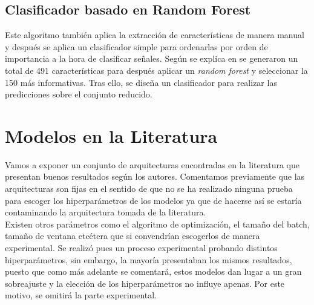     \subsection{Clasificador basado en Random Forest}
            
            Este algoritmo también aplica la extracción de características de manera manual y después se aplica un clasificador simple para ordenarlas por orden de importancia a la hora de clasificar señales. Según se explica en \cite{zabihi2017detection} se generaron un total de 491 características para después aplicar un \textit{random forest} y seleccionar la 150 más informativas. Tras ello, se diseña un clasificador para realizar las predicciones sobre el conjunto reducido. \\
    
    
\newpage 
\section{Modelos en la Literatura}

    Vamos a exponer un conjunto de arquitecturas encontradas en la literatura que presentan buenos resultados según los autores. Comentamos previamente que las arquitecturas son fijas en el sentido de que no se ha realizado ninguna prueba para escoger los hiperparámetros de los modelos ya que de hacerse así se estaría contaminando la arquitectura tomada de la literatura. \\
    
    Existen otros parámetros como el algoritmo de optimización, el tamaño del batch, tamaño de ventana etcétera que si convendrían escogerlos de manera experimental. Se realizó pues un proceso experimental probando distintos hiperparámetros, sin embargo, la mayoría presentaban los mismos resultados, puesto que como más adelante se comentará, estos modelos dan lugar a un gran sobreajuste y la elección de los hiperparámetros no influye apenas. Por este motivo, se omitirá la parte experimental. 
    
